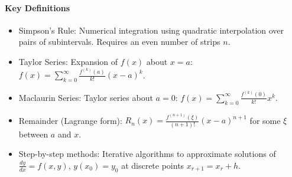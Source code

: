 \documentclass[11pt]{article}
\newcommand{\cle}[1]{{\popxbold\color{popdark}#1}}
\begin{document}
\begin{bilan}

\paragraph{Key Definitions}
\begin{itemize}
    \item \cle{Simpson's Rule}: Numerical integration using quadratic interpolation over pairs of subintervals. Requires an even number of strips $n$.
    \item \cle{Taylor Series}: Expansion of $f(x)$ about $x=a$: $f(x)=\sum_{k=0}^{\infty}\frac{f^{(k)}(a)}{k!}(x-a)^k$.
    \item \cle{Maclaurin Series}: Taylor series about $a=0$: $f(x)=\sum_{k=0}^{\infty}\frac{f^{(k)}(0)}{k!}x^k$.
    \item \cle{Remainder (Lagrange form)}: $R_n(x)=\frac{f^{(n+1)}(\xi)}{(n+1)!}(x-a)^{n+1}$ for some $\xi$ between $a$ and $x$.
    \item \cle{Step-by-step methods}: Iterative algorithms to approximate solutions of $\frac{dy}{dx}=f(x,y)$, $y(x_0)=y_0$ at discrete points $x_{r+1}=x_r+h$.
\end{itemize}


\end{bilan}
\end{document}
